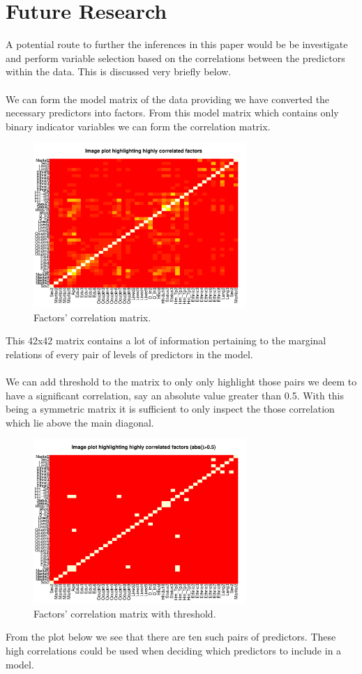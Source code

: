 \documentclass{article}
\begin{document}
\section{Future Research}
A potential route to further the inferences in this paper would be be investigate and perform variable selection based on the correlations between the predictors within the data. This is discussed very briefly below.
\\\\
We can form the model matrix of the data providing we have converted the necessary predictors into factors. From this model matrix which contains only binary indicator variables we can form the correlation matrix. 

\begin{figure}[h!]
  \centering
    \includegraphics[width=0.72\textwidth]{FutureResearch/CorrImageNoThresh.pdf}
  \caption{Factors' correlation matrix.}
\end{figure}

\noindent This 42x42 matrix contains a lot of information pertaining to the marginal relations of every pair of levels of predictors in the model.
\\\\
We can add threshold to the matrix to only only highlight those pairs we deem to have a significant correlation, say an absolute value greater than 0.5. With this being a symmetric matrix it is sufficient to only inspect the those correlation which lie above the main diagonal. 
\begin{figure}[H]
  \centering
    \includegraphics[width=0.72\textwidth]{FutureResearch/CorrImageWithThresh.pdf}
  \caption{Factors' correlation matrix with threshold.}
\end{figure}

\noindent From the plot below we see that there are ten such pairs of predictors. These high correlations could be used when deciding which predictors to include in a model.
\end{document}
